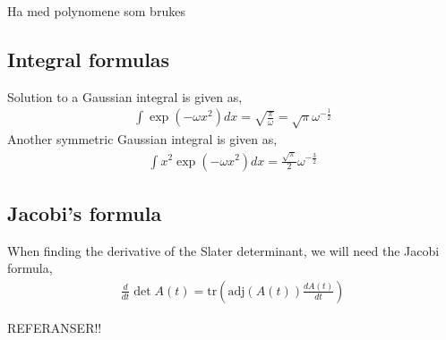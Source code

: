 \documentclass[11pt]{article}
\newcommand{\husk}[1]{\color{red} #1 \color{black}}
\begin{document}
\husk{Ha med polynomene som brukes}

\subsection{Integral formulas}
Solution to a Gaussian integral is given as,
\begin{align}
	\int \exp\left( - \omega x^2 \right) d x = \sqrt{\frac{\pi}{\omega}} = \sqrt{\pi}\omega^{-\frac{1}{2}}
	\label{eq:gaussian-integral}
\end{align}
Another symmetric Gaussian integral is given as,
\begin{align}
	\int x^2 \exp\left( - \omega x^2 \right) d x = \frac{\sqrt{\pi}}{2}\omega^{-\frac{3}{2}}
	\label{eq:gaussian-integral-x-squared}
\end{align}
\subsection{Jacobi's formula}
When finding the derivative of the Slater determinant, we will need the Jacobi formula,
\begin{align}
	\frac{d}{dt}\det A(t) = \mathrm{tr} \left( \mathrm{adj}(A(t))\frac{dA(t)}{dt} \right)
	\label{eq:jacobi-formula}
\end{align}

\husk{REFERANSER!!}
\end{document}
